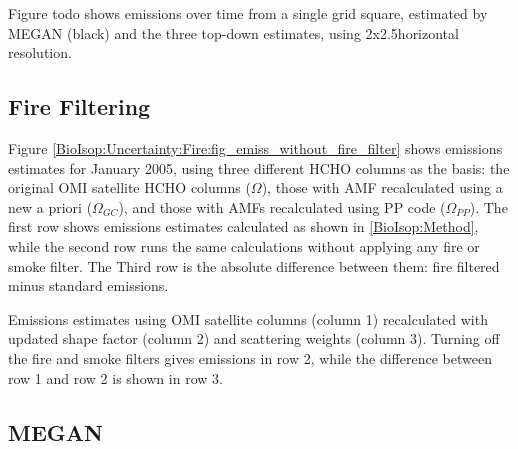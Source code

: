     Figure todo shows emissions over time from a single grid square, estimated by MEGAN (black) and the three top-down estimates, using 2x2.5\degr horizontal resolution.
  
  \subsection{Fire Filtering}
    
    Figure \ref{BioIsop:Uncertainty:Fire:fig_emiss_without_fire_filter} shows emissions estimates for January 2005, using three different HCHO columns as the basis: the original OMI satellite HCHO columns ($\Omega$), those with AMF recalculated using a new a priori ($\Omega_{GC}$), and those with AMFs recalculated using PP code ($\Omega_{PP}$).
    The first row shows emissions estimates calculated as shown in \ref{BioIsop:Method}, while the second row runs the same calculations without applying any fire or smoke filter.
    The Third row is the absolute difference between them: fire filtered minus standard emissions.
    
    {Emissions estimates using OMI satellite columns (column 1) recalculated with updated shape factor (column 2) and scattering weights (column 3). Turning off the fire and smoke filters gives emissions in row 2, while the difference between row 1 and row 2 is shown in row 3.}
    {\label{BioIsop:Uncertainty:Fire:fig_emiss_without_fire_filter}}
    
  
  \subsection{MEGAN}

